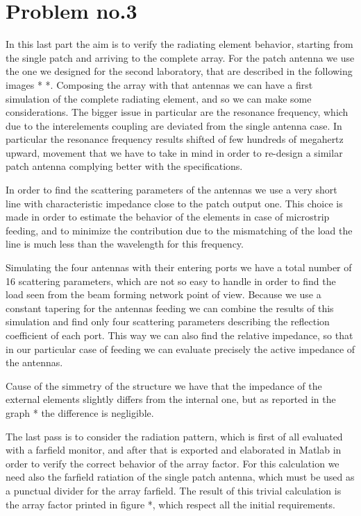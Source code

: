 \section{Problem no.3}
In this last part the aim is to verify the radiating element behavior, starting from the single patch and arriving to the complete array. For the patch antenna we use the one we designed for the second laboratory, that are described in the following images * *. Composing the array with that antennas we can have a first simulation of the complete radiating element, and so we can make some considerations. The bigger issue in particular are the resonance frequency, which due to the interelements coupling are deviated from the single antenna case. In particular the resonance frequency results shifted of few hundreds of megahertz upward, movement that we have to take in mind in order to re-design a similar patch antenna complying better with the specifications.

In order to find the scattering parameters of the antennas we use a very short line with characteristic impedance close to the patch output one. This choice is made in order to estimate the behavior of the elements in case of microstrip feeding, and to minimize the contribution due to the mismatching of the load the line is much less than the wavelength for this frequency.

Simulating the four antennas with their entering ports we have a total number of 16 scattering parameters, which are not so easy to handle in order to find the load seen from the beam forming network point of view. Because we use a constant tapering for the antennas feeding we can combine the results of this simulation and find only four scattering parameters describing the reflection coefficient of each port. This way we can also find the relative impedance, so that in our particular case of feeding we can evaluate precisely the active impedance of the antennas.

Cause of the simmetry of the structure we have that the impedance of the external elements slightly differs from the internal one, but as reported in the graph * the difference is negligible.

The last pass is to consider the radiation pattern, which is first of all evaluated with a farfield monitor, and after that is exported and elaborated in Matlab in order to verify the correct behavior of the array factor. For this calculation we need also the farfield ratiation of the single patch antenna, which must be used as a punctual divider for the array farfield. The result of this trivial calculation is the array factor printed in figure *, which respect all the initial requirements.
